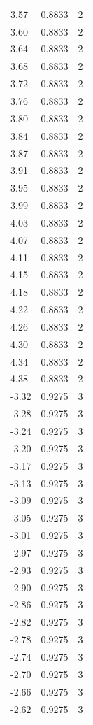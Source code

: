 \begin{longtable}{lrr}
  3.57 & 0.8833 & 2 \\
  3.60 & 0.8833 & 2 \\
  3.64 & 0.8833 & 2 \\
  3.68 & 0.8833 & 2 \\
  3.72 & 0.8833 & 2 \\
  3.76 & 0.8833 & 2 \\
  3.80 & 0.8833 & 2 \\
  3.84 & 0.8833 & 2 \\
  3.87 & 0.8833 & 2 \\
  3.91 & 0.8833 & 2 \\
  3.95 & 0.8833 & 2 \\
  3.99 & 0.8833 & 2 \\
  4.03 & 0.8833 & 2 \\
  4.07 & 0.8833 & 2 \\
  4.11 & 0.8833 & 2 \\
  4.15 & 0.8833 & 2 \\
  4.18 & 0.8833 & 2 \\
  4.22 & 0.8833 & 2 \\
  4.26 & 0.8833 & 2 \\
  4.30 & 0.8833 & 2 \\
  4.34 & 0.8833 & 2 \\
  4.38 & 0.8833 & 2 \\
  -3.32 & 0.9275 & 3 \\
  -3.28 & 0.9275 & 3 \\
  -3.24 & 0.9275 & 3 \\
  -3.20 & 0.9275 & 3 \\
  -3.17 & 0.9275 & 3 \\
  -3.13 & 0.9275 & 3 \\
  -3.09 & 0.9275 & 3 \\
  -3.05 & 0.9275 & 3 \\
  -3.01 & 0.9275 & 3 \\
  -2.97 & 0.9275 & 3 \\
  -2.93 & 0.9275 & 3 \\
  -2.90 & 0.9275 & 3 \\
  -2.86 & 0.9275 & 3 \\
  -2.82 & 0.9275 & 3 \\
  -2.78 & 0.9275 & 3 \\
  -2.74 & 0.9275 & 3 \\
  -2.70 & 0.9275 & 3 \\
  -2.66 & 0.9275 & 3 \\
  -2.62 & 0.9275 & 3 \\

\end{longtable}
